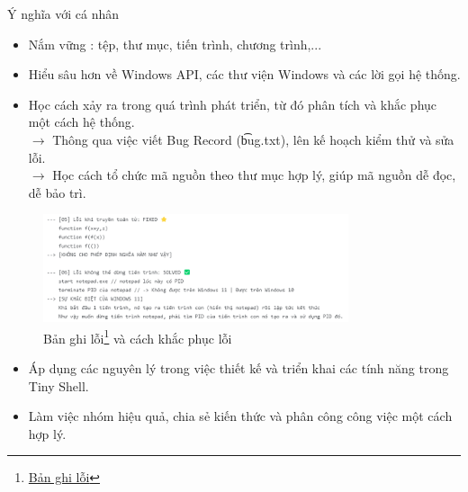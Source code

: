 \begin{frame}{Ý nghĩa với cá nhân}
\begin{itemize}
    \item Nắm vững : tệp, thư mục, tiến trình, chương trình,...
    \item Hiểu sâu hơn về Windows API, các thư viện Windows và các lời gọi hệ thống.
    \item Học cách  xảy ra trong quá trình phát triển, từ đó phân tích và khắc phục một cách hệ thống.\\
    $\to$ Thông qua việc viết Bug Record (\t{bug.txt}), lên kế hoạch kiểm thử và sửa lỗi.\\
    $\to$ Học cách tổ chức mã nguồn theo thư mục hợp lý, giúp mã nguồn dễ đọc, dễ bảo trì.
\end{itemize}
\end{frame}

\begin{frame}
\begin{figure}
    \centering
    \includegraphics[width=0.8\textwidth]{images/12.png}
    \caption{Bản ghi lỗi\footnote{ \href{https://github.com/HaiAu2501/Operating-System-Project/blob/main/bug.txt}{Bản ghi lỗi}} và cách khắc phục lỗi}
    \label{fig:enter-label}
\end{figure}
\begin{itemize}
    \item  Áp dụng các nguyên lý  trong việc thiết kế và triển khai các tính năng trong Tiny Shell.
    \item Làm việc nhóm hiệu quả, chia sẻ kiến thức và phân công công việc một cách hợp lý.
\end{itemize}
\end{frame}


